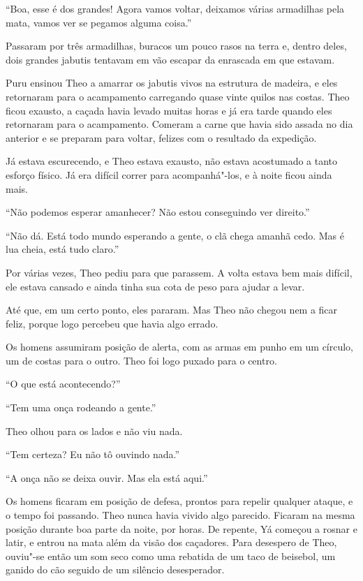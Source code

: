 ``Boa, esse é dos grandes! Agora vamos voltar, deixamos várias
armadilhas pela mata, vamos ver se pegamos alguma coisa.''

Passaram por três armadilhas, buracos um pouco rasos na terra e,
dentro deles, dois grandes jabutis tentavam em vão escapar da enrascada
em que estavam.

Puru ensinou Theo a amarrar os jabutis vivos na estrutura de madeira, e
eles retornaram para o acampamento carregando quase vinte quilos nas
costas. Theo ficou exausto, a caçada havia levado muitas horas e já era
tarde quando eles retornaram para o acampamento. Comeram a carne
que havia sido assada no dia anterior e se preparam para voltar, felizes
com o resultado da expedição.

Já estava escurecendo, e Theo estava exausto, não estava acostumado a
tanto esforço físico. Já era difícil correr para acompanhá"-los, e à noite
ficou ainda mais.

``Não podemos esperar amanhecer? Não estou conseguindo ver direito.''

``Não dá. Está todo mundo esperando a gente, o clã chega amanhã cedo. Mas
é lua cheia, está tudo claro.''

Por várias vezes, Theo pediu para que parassem. A volta estava bem mais
difícil, ele estava cansado e ainda tinha sua cota de peso para ajudar a
levar.

Até que, em um certo ponto, eles pararam. Mas Theo não chegou nem a ficar feliz,
porque logo percebeu que havia algo errado.

Os homens assumiram posição de alerta, com as armas em punho em um
círculo, um de costas para o outro. Theo foi logo puxado para o centro.

``O que está acontecendo?''

``Tem uma onça rodeando a gente.''

Theo olhou para os lados e não viu nada.

``Tem certeza? Eu não tô ouvindo nada.''

``A onça não se deixa ouvir. Mas ela está aqui.''

Os homens ficaram em posição de defesa, prontos para repelir qualquer
ataque, e o tempo foi passando. Theo nunca havia vivido algo parecido.
Ficaram na mesma posição durante boa parte da noite, por horas. De
repente, Yá começou a rosnar e latir, e entrou na mata além da visão dos
caçadores. Para desespero de Theo, ouviu"-se então um som seco como uma
rebatida de um taco de beisebol, um ganido do cão seguido de um silêncio
desesperador.

